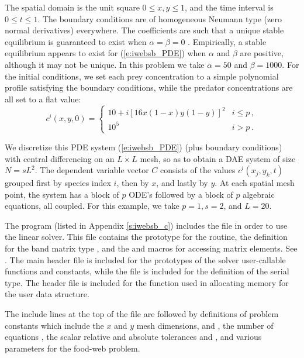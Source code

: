 The spatial domain is the unit square $0 \leq x,y \leq 1$, and the
time interval is $0 \leq t \leq 1$.  The boundary conditions are of
homogeneous Neumann type (zero normal derivatives) everywhere.  
The coefficients
are such that a unique stable equilibrium is guaranteed to exist when
$\alpha = \beta = 0$ \cite{Bro:86}.  Empirically, a stable equilibrium
appears to exist for (\ref{e:iwebsb_PDE}) when $\alpha$ and $\beta$ are
positive, although it may not be unique. In this problem we take
$\alpha = 50$ and $\beta = 1000$.  For the initial conditions, we set
each prey concentration to a simple polynomial profile satisfying the
boundary conditions, while the predator concentrations are all set to
a flat value:
\begin{equation*}
c^i(x,y,0) = 
\begin{cases}
  10 + i [16x(1 - x)y(1 - y)]^2 & i \leq p \, , \\
  10^5                          & i > p \, .
\end{cases}
\end{equation*}

We discretize this PDE system (\ref{e:iwebsb_PDE}) (plus boundary conditions)
with central differencing on an $L \times L$ mesh, so as to obtain a
DAE system of size $N = s L^2$.  The dependent variable vector $C$
consists of the values $c^i(x_j,y_k,t)$ grouped first by species index
$i$, then by $x$, and lastly by $y$.  At each spatial mesh point, the
system has a block of $p$ ODE's followed by a block of $p$ algebraic
equations, all coupled.
For this example, we take $p = 1, s = 2$, and $L = 20$.

The  program (listed in Appendix \ref{s:iwebsb_c})
includes the file  in order to use the {\idaband} linear solver. 
This file contains the prototype for the  routine,
the definition for the band matrix type , and the
 and  macros for accessing matrix
elements. See .
The main {\ida} header file  is included for the prototypes of the
solver user-callable functions and {\ida} constants, while the file 
is included for the definition of the serial  type.
The header file  is included for the  function
used in allocating memory for the user data structure.

The include lines at the top of the file are followed by definitions of
problem constants which include the $x$ and $y$ mesh dimensions,  and
, the number of equations , the scalar relative and absolute tolerances
 and , and various parameters for the food-web problem.

